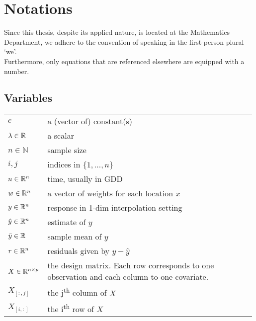 \chapter*{\vspace{-3.5cm} Notations}
\label{c:Notation}
\vspace{-0.6cm}
Since this thesis, despite its applied nature, is located at the Mathematics Department, we adhere to the convention of speaking in the first-person plural `we'.\\
Furthermore, only equations that are referenced elsewhere are equipped with a number.

\section*{Variables}\vspace{-0.3cm}
\renewcommand{\arraystretch}{1.3} %
\begin{longtable}{p{0.12\linewidth} p{0.87\linewidth}}
$c$		& a (vector of) constant(s)\\
$\lambda \in \mathbb{R}$		& a scalar\\
$n\in \mathbb{N}$		& sample size\\
$i,j$		& indices in $\{1,\dots,n\}$\\
$n\in \mathbb{R}^n$		& time, usually in GDD\\
$w \in \mathbb{R}^n$		& a vector of weights for each location $x$\\
$y\in \mathbb{R}^n$		& response in 1-dim interpolation setting\\
$\hat y\in \mathbb{R}^n$		& estimate of $y$\\
$\bar y\in \mathbb{R}$		& sample mean of $y$\\
$r \in \mathbb{R}^n$		& residuals given by $y - \hat y$\\
$X\in\mathbb{R}^{n\times p}$ & the design matrix. Each row corresponds to one observation and each column to one covariate.\\
$X_{[:,j]}$ 	& the j\textsuperscript{th} column of $X$\\
$X_{[i,:]}$ 	& the i\textsuperscript{th} row of $X$
\end{longtable}

